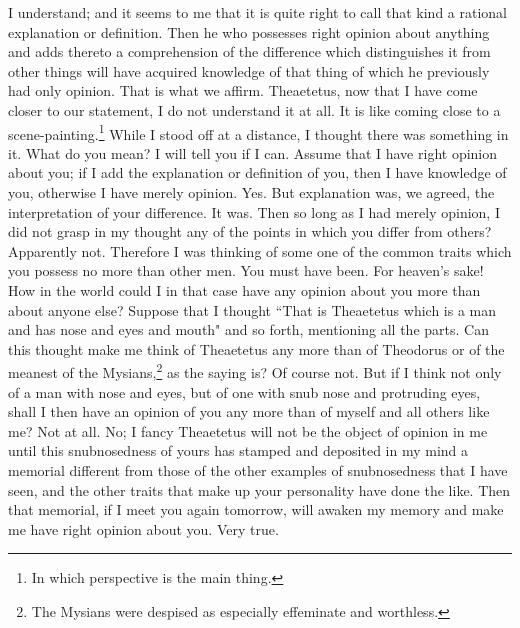 \documentclass[letterpaper,12pt]{article}
\newcommand{\stephpag}[1]{\marginnote{\small\itshape\fontfamily{ppl}\selectfont #1}}
\begin{document}
\begin{drama}
\theaetetusspeaks
I understand; and it seems to me that it is quite right to call that kind a rational explanation or definition.
\socratesspeaks
Then he who possesses right opinion about anything and adds thereto a comprehension of the difference which distinguishes it from other things will have acquired knowledge of that thing of which he previously had only opinion.
\theaetetusspeaks
That is what we affirm.
\socratesspeaks
Theaetetus, now that I have come closer to our statement, I do not understand it at all. It is like coming close to a scene-painting.\footnote{In which perspective is the main thing.} While I stood off at a distance, I thought there was something in it.
\theaetetusspeaks
What do you mean? \stephpag{209 a}
\socratesspeaks
I will tell you if I can. Assume that I have right opinion about you; if I add the explanation or definition of you, then I have knowledge of you, otherwise I have merely opinion.
\theaetetusspeaks
Yes.
\socratesspeaks
But explanation was, we agreed, the interpretation of your difference.
\theaetetusspeaks
It was.
\socratesspeaks
Then so long as I had merely opinion, I did not grasp in my thought any of the points in which you differ from others?
\theaetetusspeaks
Apparently not.
\socratesspeaks
Therefore I was thinking of some one of the common traits which you possess no more than other men. \stephpag{b}
\theaetetusspeaks
You must have been.
\socratesspeaks
For heaven's sake! How in the world could I in that case have any opinion about you more than about anyone else? Suppose that I thought ``That is Theaetetus which is a man and has nose and eyes and mouth" and so forth, mentioning all the parts. Can this thought make me think of Theaetetus any more than of Theodorus or of the meanest of the Mysians,\footnote{The Mysians were despised as especially effeminate and worthless.} as the saying is?
\theaetetusspeaks
Of course not.
\socratesspeaks
But if I think not only of a man with nose and eyes, \stephpag{c} but of one with snub nose and protruding eyes, shall I then have an opinion of you any more than of myself and all others like me?
\theaetetusspeaks
Not at all.
\socratesspeaks
No; I fancy Theaetetus will not be the object of opinion in me until this snubnosedness of yours has stamped and deposited in my mind a memorial different from those of the other examples of snubnosedness that I have seen, and the other traits that make up your personality have done the like. Then that memorial, if I meet you again tomorrow, will awaken my memory and make me have right opinion about you.
\theaetetusspeaks
Very true. \stephpag{d}

\end{drama}
\end{document}
